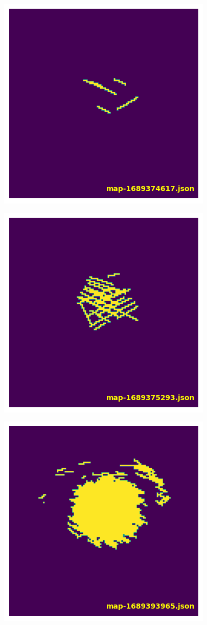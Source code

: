 \documentclass[NET,english,beameralt]{tumbeamer}
\begin{document}
\begin{frame}[fragile]
    \begin{figure}
        \includegraphics[width=0.4\columnwidth]{pics/map2.png}
    \end{figure}
\end{frame}

\begin{frame}[fragile]
    \begin{figure}
        \includegraphics[width=0.4\columnwidth]{pics/map3.png}
    \end{figure}
\end{frame}

\begin{frame}[fragile]
    \begin{figure}
        \includegraphics[width=0.4\columnwidth]{pics/map4.png}
    \end{figure}
\end{frame}
\end{document}
